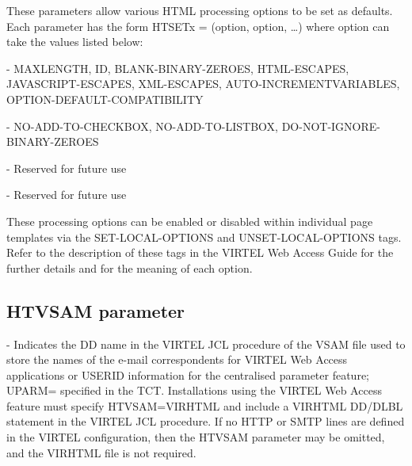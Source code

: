 \documentclass[letterpaper,10pt,english]{sphinxmanual}
\begin{document}
These parameters allow various HTML processing options to be set as defaults. Each parameter has the form HTSETx = (option, option, …) where option can take the values listed below:

 - MAXLENGTH, ID, BLANK-BINARY-ZEROES, HTML-ESCAPES, JAVASCRIPT-ESCAPES, XML-ESCAPES, AUTO-INCREMENTVARIABLES, OPTION-DEFAULT-COMPATIBILITY

 - NO-ADD-TO-CHECKBOX, NO-ADD-TO-LISTBOX, DO-NOT-IGNORE-BINARY-ZEROES

 - Reserved for future use

 - Reserved for future use

These processing options can be enabled or disabled within individual page templates via the SET-LOCAL-OPTIONS and UNSET-LOCAL-OPTIONS tags. Refer to the description of these tags in the VIRTEL Web Access Guide for the further details and for the meaning of each option.

\ignorespaces 

\subsection{HTVSAM parameter}
\label{\detokenize{Installation_Guide:htvsam-parameter}}\label{\detokenize{Installation_Guide:index-81}}
\begin{sphinxVerbatim}[commandchars=\\\{\}]
                      
\end{sphinxVerbatim}

 - Indicates the DD name in the VIRTEL JCL procedure of the VSAM file used to store the names of the e-mail correspondents for VIRTEL Web Access applications or USERID information for the centralised parameter feature; UPARM= specified in the TCT. Installations using the VIRTEL Web Access feature must specify HTVSAM=VIRHTML and include a VIRHTML DD/DLBL statement in the VIRTEL JCL procedure. If no HTTP or SMTP lines are defined in the VIRTEL configuration, then the HTVSAM parameter may be omitted, and the VIRHTML file is not required.

\ignorespaces 
\end{document}
